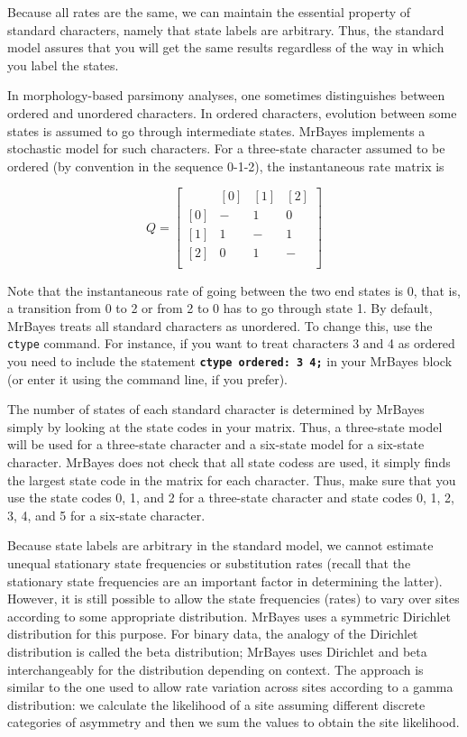 \documentclass[12pt]{book}
\newcommand{\ttt}[1]{\texttt{#1} }
\newcommand{\tb}[1]{\texttt{\textbf{#1}} }
\begin{document}
Because all rates are the same, we can maintain the essential property of standard
characters, namely that state labels are arbitrary. Thus, the standard model assures that
you will get the same results regardless of the way in which you label the states.

In morphology-based parsimony analyses, one sometimes distinguishes between ordered
and unordered characters. In ordered characters, evolution between some states is
assumed to go through intermediate states. MrBayes implements a stochastic model for
such characters. For a three-state character assumed to be ordered (by convention in the
sequence 0-1-2), the instantaneous rate matrix is

\[
Q=\begin{bmatrix}
    & [0] & [1] & [2]\\ 
 [0]& - & 1 & 0\\ 
 [1]& 1& -  & 1\\ 
 [2]& 0& 1  & -\\ 
\end{bmatrix}
\]

Note that the instantaneous rate of going between the two end states is 0, that is, a
transition from 0 to 2 or from 2 to 0 has to go through state 1. By default, MrBayes treats
all standard characters as unordered. To change this, use the \ttt{ctype} command. For
instance, if you want to treat characters 3 and 4 as ordered you need to include the
statement \tb{ctype ordered: 3 4;} in your MrBayes block (or enter it using the
command line, if you prefer).

The number of states of each standard character is determined by MrBayes simply by
looking at the state codes in your matrix. Thus, a three-state model will be used for a
three-state character and a six-state model for a six-state character. MrBayes does not
check that all state codess are used, it simply finds the largest state code in the matrix for
each character. Thus, make sure that you use the state codes 0, 1, and 2 for a three-state
character and state codes 0, 1, 2, 3, 4, and 5 for a six-state character.

Because state labels are arbitrary in the standard model, we cannot estimate unequal
stationary state frequencies or substitution rates (recall that the stationary state
frequencies are an important factor in determining the latter). However, it is still possible
to allow the state frequencies (rates) to vary over sites according to some appropriate
distribution. MrBayes uses a symmetric Dirichlet distribution for this purpose. For binary
data, the analogy of the Dirichlet distribution is called the beta distribution; MrBayes uses
Dirichlet and beta interchangeably for the distribution depending on context. The
approach is similar to the one used to allow rate variation across sites according to a
gamma distribution: we calculate the likelihood of a site assuming different discrete
categories of asymmetry and then we sum the values to obtain the site likelihood.
\end{document}
